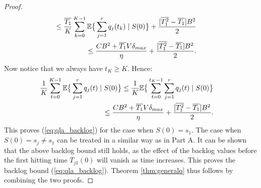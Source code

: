 \documentclass[journal]{IEEEtran}
\newcommand{\expect}[1]{\mathbb{E}\big\{#1\big\}}
\begin{document}
\begin{proof}
\begin{eqnarray*}
\hspace{-.3in}&&\leq\frac{\overline{T_1}}{K} \sum_{k=0}^{K-1} \expect{\sum_{j=1}^rq_j(t_k)\left.|\right. S(0)} + \frac{[\overline{T_1^2}-\overline{T_1}]B^2}{2}\\
\hspace{-.3in}&&\leq \frac{CB^2 + \overline{T_1}V\delta_{max} }{\eta} + \frac{[\overline{T_1^2}-\overline{T_1}]B^2}{2}. 
\end{eqnarray*}
Now notice that we always have $t_K\geq K$. Hence:
\begin{eqnarray*}
\hspace{-.3in}&&\frac{1}{K}\sum_{t=0}^{K-1}\expect{\sum_{j=1}^rq_j(t)\left.|\right. S(0)} \leq\frac{1}{K}\expect{\sum_{t=0}^{t_K-1}\sum_{j=1}^rq_j(t)\left.|\right. S(0)} \\
\hspace{-.3in}&&\qquad\qquad\qquad\qquad \leq \frac{CB^2 + \overline{T_1}V\delta_{max} }{\eta} +\frac{[\overline{T_1^2}-\overline{T_1}]B^2}{2}. 
\end{eqnarray*}
This proves  (\ref{eq:qla_backlog}) for the case when $S(0)=s_1$. The case when $S(0)=s_j\neq s_1$ can be treated in a similar way as in Part A. It can be shown that the above backlog bound still holds, as the effect of the backlog values before the first hitting time $T_{j1}(0)$ will vanish as time increases. 
This proves the backlog bound (\ref{eq:qla_backlog}).
Theorem \ref{thm:generalq} thus follows by combining the two proofs. 
\end{proof}



%



\end{document}
